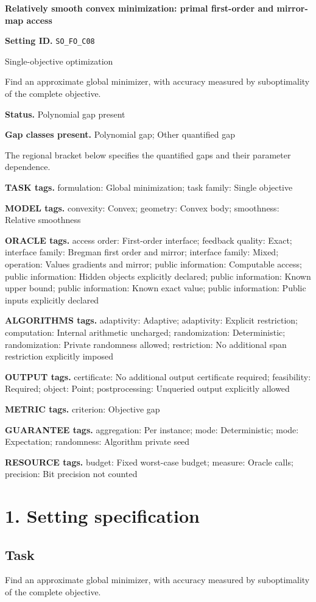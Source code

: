 \documentclass[10pt,a4paper]{article}
\begin{document}
\raggedright

{\LARGE\bfseries\sffamily\color{AtlasNavy} Relatively smooth convex minimization: primal first-order and mirror-map access\par}\vspace{5pt}
\textbf{Setting ID.} \texttt{SO\_\allowbreak{}FO\_\allowbreak{}C08}

Single-objective optimization

Find an approximate global minimizer, with accuracy measured by suboptimality of the complete objective.

\textbf{Status.} Polynomial gap present

\textbf{Gap classes present.} Polynomial gap; Other quantified gap

The regional bracket below specifies the quantified gaps and their parameter dependence.

\textbf{TASK tags.} formulation: Global minimization; task family: Single objective

\textbf{MODEL tags.} convexity: Convex; geometry: Convex body; smoothness: Relative smoothness

\textbf{ORACLE tags.} access order: First-order interface; feedback quality: Exact; interface family: Bregman first order and mirror; interface family: Mixed; operation: Values gradients and mirror; public information: Computable access; public information: Hidden objects explicitly declared; public information: Known upper bound; public information: Known exact value; public information: Public inputs explicitly declared

\textbf{ALGORITHMS tags.} adaptivity: Adaptive; adaptivity: Explicit restriction; computation: Internal arithmetic uncharged; randomization: Deterministic; randomization: Private randomness allowed; restriction: No additional span restriction explicitly imposed

\textbf{OUTPUT tags.} certificate: No additional output certificate required; feasibility: Required; object: Point; postprocessing: Unqueried output explicitly allowed

\textbf{METRIC tags.} criterion: Objective gap

\textbf{GUARANTEE tags.} aggregation: Per instance; mode: Deterministic; mode: Expectation; randomness: Algorithm private seed

\textbf{RESOURCE tags.} budget: Fixed worst-case budget; measure: Oracle calls; precision: Bit precision not counted

\section{1. Setting specification}
\subsection{Task}
Find an approximate global minimizer, with accuracy measured by suboptimality of the complete objective.
\end{document}
